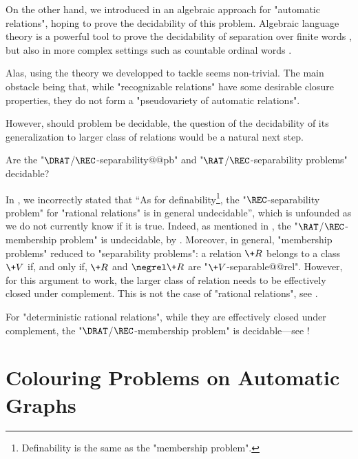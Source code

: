 On the other hand, we introduced in  an algebraic approach for
"automatic relations", hoping to prove the decidability of this problem.
Algebraic language theory is a powerful tool to prove the decidability of separation
over finite words \cite{PlaceZeitoun2016SeparatingRegularLanguages},
but also in more complex settings such as countable ordinal words \cite{ColcombetGoolMorvan2022FOSeparation}.

Alas, using the theory we developped to tackle 
seems non-trivial. The main obstacle being that, while
"recognizable relations" have some desirable closure properties,
they do not form a "pseudovariety of automatic relations".

However, should  problem be decidable, the question of
the decidability of its generalization to larger class of relations would be
a natural next step.

\begin{openproblem}
	Are the "$\DRAT$/$\REC$-separability@@pb" and
	"$\RAT$/$\REC$-sepa\-ra\-bility problems" decidable?
\end{openproblem}

In \cite[\S~1]{BarceloFigueiraMorvan2023SeparatingAutomatic},
we incorrectly stated that ``As for definability\footnote{Definability is the same
as the "membership problem".}, the "$\REC$-separability problem" for "rational relations" is in general undecidable'', which is unfounded as we do not currently know if it is true.
Indeed, as mentioned in ,
the "$\RAT$/$\REC$-membership problem" is undecidable, by
\cite[\S~III, Theorem~8.4]{Berstel1979Transductions}.
Moreover, in general, "membership problems" reduced to "separability problems":
a relation $\+R$ belongs to a class $\+V$ if, and only if, $\+R$ and $\negrel \+R$
are "$\+V$-separable@@rel". However, for this argument to work, the larger class of relation
needs to be effectively closed under complement.
This is not the case of "rational relations", see .

For "deterministic rational relations", while they are effectively
closed under complement, the "$\DRAT$/$\REC$-membership problem"
is decidable---see !

\section{Colouring Problems on Automatic Graphs}

